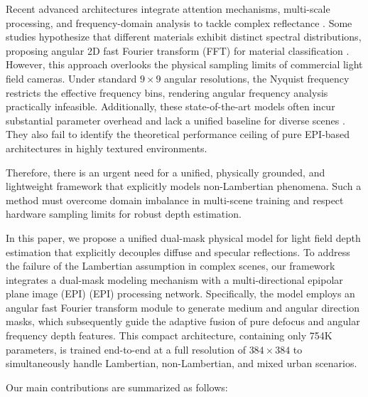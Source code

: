 \documentclass[lettersize,journal]{IEEEtran}
\begin{document}
Recent advanced architectures integrate attention mechanisms, multi-scale processing, and frequency-domain analysis to tackle complex reflectance \cite{attentionatten}. Some studies hypothesize that different materials exhibit distinct spectral distributions, proposing angular 2D fast Fourier transform (FFT) for material classification \cite{dd}. However, this approach overlooks the physical sampling limits of commercial light field cameras. Under standard $9 \times 9$ angular resolutions, the Nyquist frequency restricts the effective frequency bins, rendering angular frequency analysis practically infeasible. Additionally, these state-of-the-art models often incur substantial parameter overhead and lack a unified baseline for diverse scenes \cite{parameterparam}. They also fail to identify the theoretical performance ceiling of pure EPI-based architectures in highly textured environments.

Therefore, there is an urgent need for a unified, physically grounded, and lightweight framework that explicitly models non-Lambertian phenomena. Such a method must overcome domain imbalance in multi-scene training and respect hardware sampling limits for robust depth estimation.

In this paper, we propose a unified dual-mask physical model for light field depth estimation that explicitly decouples diffuse and specular reflections. To address the failure of the Lambertian assumption in complex scenes, our framework integrates a dual-mask modeling mechanism with a multi-directional epipolar plane image (EPI) (EPI) processing network. Specifically, the model employs an angular fast Fourier transform module to generate medium and angular direction masks, which subsequently guide the adaptive fusion of pure defocus and angular frequency depth features. This compact architecture, containing only 754K parameters, is trained end-to-end at a full resolution of $384 \times 384$ to simultaneously handle Lambertian, non-Lambertian, and mixed urban scenarios.

Our main contributions are summarized as follows:
\end{document}
